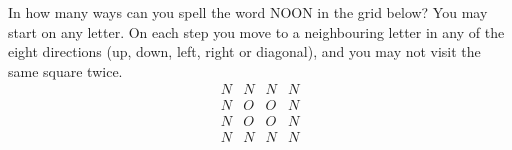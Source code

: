 In how many ways can you spell the word NOON in the grid below? You may start on any letter. On each step you move to a neighbouring letter in any of the eight directions (up, down, left, right or diagonal), and you may not visit the same square twice.
\[
\begin{array}{cccc}
N&N&N&N\\
N&O&O&N\\
N&O&O&N\\
N&N&N&N
\end{array}
\]

